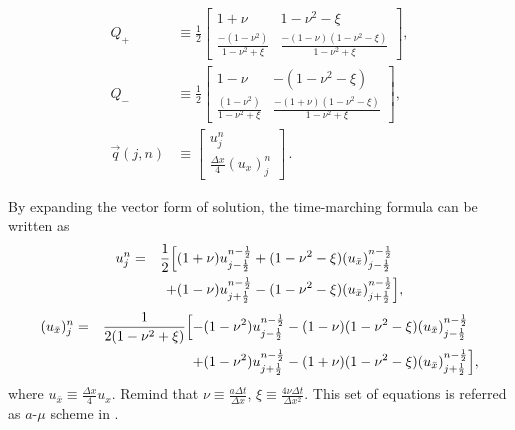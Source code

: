 \documentclass[letterpaper,12pt,dvips]{article}
\numberwithin{equation}{section}
\begin{document}
\begin{align*}
  Q_+ &\equiv 
    \frac{1}{2}
    \left[\begin{array}{cc}
      1+\nu                                     & 
      1-\nu^2-\xi                               \\
      \frac{-(1-\nu^2)}{1-\nu^2+\xi}            & 
      \frac{-(1-\nu)(1-\nu^2-\xi)}{1-\nu^2+\xi}
    \end{array}\right], \\
  Q_- &\equiv 
    \frac{1}{2}
    \left[\begin{array}{cc}
      1-\nu                                     & 
      -(1-\nu^2-\xi)                            \\
      \frac{(1-\nu^2)}{1-\nu^2+\xi}             & 
      \frac{-(1+\nu)(1-\nu^2-\xi)}{1-\nu^2+\xi}
    \end{array}\right], \\
  \vec{q}(j,n) &\equiv 
    \left[\begin{array}{c}
      u_j^n \\ \frac{\Delta x}{4}(u_x)_j^n 
    \end{array}\right]\,.
\end{align*}

By expanding the vector form of solution, the time-marching formula can be 
written as
\begin{alignat}{2}
  u_j^n &= &\frac{1}{2}\Big[
    &(1+\nu)u_{j-\frac{1}{2}}^{n-\frac{1}{2}} 
    + (1-\nu^2-\xi)(u_{\bar{x}})_{j-\frac{1}{2}}^{n-\frac{1}{2}} 
    \notag \\
  &&+ &(1-\nu)u_{j+\frac{1}{2}}^{n-\frac{1}{2}}
    - (1-\nu^2-\xi)(u_{\bar{x}})_{j+\frac{1}{2}}^{n-\frac{1}{2}}
           \Big] \label{e:amuu},
\end{alignat}
\begin{alignat}{2}
  (u_{\bar{x}})_j^n &= &\frac{1}{2(1-\nu^2+\xi)}\Big[
    -& (1-\nu^2)u_{j-\frac{1}{2}}^{n-\frac{1}{2}}
    -  (1-\nu)(1-\nu^2-\xi)(u_{\bar{x}})_{j-\frac{1}{2}}^{n-\frac{1}{2}} 
    \notag \\
  &&+& (1-\nu^2)u_{j+\frac{1}{2}}^{n-\frac{1}{2}}
    -  (1+\nu)(1-\nu^2-\xi)(u_{\bar{x}})_{j+\frac{1}{2}}^{n-\frac{1}{2}}
                       \Big] \label{e:amuux}, 
\end{alignat}
where $u_{\bar{x}}\equiv\frac{\Delta x}{4}u_x$.
Remind that $\nu\equiv\frac{a\Delta t}{\Delta x}$, 
$\xi\equiv\frac{4\nu\Delta t}{\Delta x^2}$.
This set of equations is referred as $a$-$\mu$ scheme in 
\cite{b:chang95}.
\end{document}
